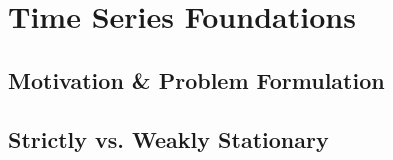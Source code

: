 \section{Time Series Foundations}
\subsection{Motivation \& Problem Formulation}


\subsection{Strictly vs. Weakly Stationary}
